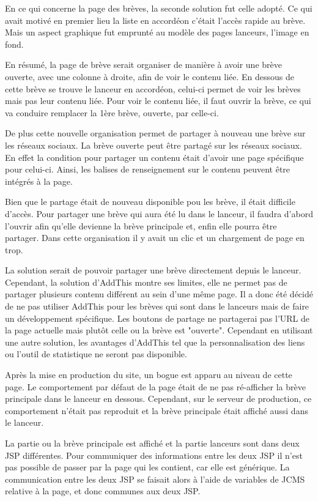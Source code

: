 \documentclass[12pt,a4paper]{article}
\begin{document}
En ce qui concerne la page des brèves, la seconde solution fut celle adopté. Ce qui avait motivé en premier lieu la liste en accordéon c'était l'accès rapide au brève. Mais un aspect graphique fut emprunté au modèle des pages lanceurs, l'image en fond.\par 
En résumé, la page de brève serait organiser de manière à avoir une brève ouverte, avec une colonne à droite, afin de voir le contenu liée. En dessous de cette brève se trouve le lanceur en accordéon, celui-ci permet de voir les brèves mais pas leur contenu liée. Pour voir le contenu liée, il faut ouvrir la brève, ce qui va conduire remplacer la 1ère brève, ouverte, par celle-ci.\par
De plus cette nouvelle organisation permet de partager à nouveau une brève sur les réseaux sociaux. La brève ouverte peut être partagé sur les réseaux sociaux. En effet la condition pour partager un contenu était d'avoir une page spécifique pour celui-ci. Ainsi, les balises de renseignement sur le contenu peuvent être intégrés à la page.\par 
Bien que le partage était de nouveau disponible pou les brève, il était difficile d'accès. Pour partager une brève qui aura été lu dans le lanceur, il faudra d'abord l'ouvrir afin qu'elle devienne la brève principale et, enfin elle pourra être partager. Dans cette organisation il y avait un clic et un chargement de page en trop.\par 
La solution serait de pouvoir partager une brève directement depuis le lanceur. Cependant, la solution d'AddThis montre ses limites, elle ne permet pas de partager plusieurs contenu différent au sein d'une même page. Il a donc été décidé de ne pas utiliser AddThis pour les brèves qui sont dans le lanceurs mais de faire un développement spécifique. Les boutons de partage ne partagerai pas l'URL de la page actuelle mais plutôt celle ou la brève est "ouverte". Cependant en utilisant une autre solution, les avantages d'AddThis tel que la personnalisation des liens ou l'outil de statistique ne seront pas disponible.\par
\bigskip
Après la mise en production du site, un bogue est apparu au niveau de cette page. Le comportement par défaut de la page était de ne pas ré-afficher la brève principale dans le lanceur en dessous. Cependant, sur le serveur de production, ce comportement n'était pas reproduit et la brève principale était affiché aussi dans le lanceur.\par 
La partie ou la brève principale est affiché et la partie lanceurs sont dans deux JSP différentes. Pour communiquer des informations entre les deux JSP il n'est pas possible de passer par la page qui les contient, car elle est générique. La communication entre les deux JSP se faisait alors à l'aide de variables de JCMS relative à la page, et donc communes aux deux JSP.\par 
\end{document}
